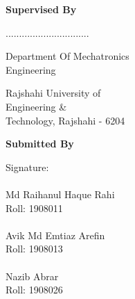 \begin{center}
\begin{multicols}{2}
    \noindent \textbf{Supervised By}


    \noindent ...............................

    \noindent Department Of Mechatronics\\    
    Engineering

    \noindent Rajshahi University of\\
    Engineering \&\\
    Technology, Rajshahi - 6204

    \columnbreak
    
    \noindent \textbf{Submitted By}
    
    Signature:\\

    \noindent \makebox[6cm]{\dotfill}\\
    Md Raihanul Haque Rahi\\
    Roll: 1908011\\

    \noindent \makebox[6cm]{\dotfill}\\
    Avik Md Emtiaz Arefin\\
    Roll: 1908013\\

    \noindent \makebox[6cm]{\dotfill}\\
    Nazib Abrar\\
    Roll: 1908026\\

\end{multicols}
\end{center}